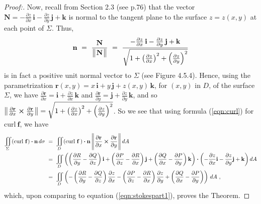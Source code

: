 \begin{proofbar}
\begin{proof}[Proof:]
 Now, recall from Section 2.3 (see p.76) that the vector $\mathbf{N} = -\frac{\partial z}{\partial x}\,\mathbf{i} -
 \frac{\partial z}{\partial y}\,\mathbf{j} + \mathbf{k}$ is normal to the tangent plane to the surface $z=z(x,y)$ at
 each point of $\Sigma$. Thus,
 \begin{displaymath}
  \mathbf{n} ~=~ \frac{\mathbf{N}}{\bigl\lVert\mspace{1mu}\mathbf{N}\mspace{1mu}\bigr\rVert} ~=~
   \frac{-\frac{\partial z}{\partial x}\,\mathbf{i} - \frac{\partial z}{\partial y}\,\mathbf{j} +
   \mathbf{k}}{\sqrt{1 + \left( \tfrac{\partial z}{\partial x} \right)^2 +
   \left( \tfrac{\partial z}{\partial y} \right)^2}}
 \end{displaymath}
 is in fact a positive unit normal vector to $\Sigma$ (see Figure 4.5.4). Hence, using the parametrization
 $\mathbf{r}(x,y) = x\,\mathbf{i} + y\,\mathbf{j} + z(x,y)\,\mathbf{k}$, for $(x,y)$ in $D$, of the surface $\Sigma$,
 we have $\frac{\partial \mathbf{r}}{\partial x} = \mathbf{i} + \frac{\partial z}{\partial x}\,\mathbf{k}$ and
 $\frac{\partial \mathbf{r}}{\partial y} = \mathbf{j} + \frac{\partial z}{\partial y}\,\mathbf{k}$, and so
 $\bigl\lVert\mspace{1mu}\frac{\partial \mathbf{r}}{\partial x} \bm{\times} \frac{\partial \mathbf{r}}{\partial y}\mspace{1mu}\bigr\rVert =
   \sqrt{1 + \left( \tfrac{\partial z}{\partial x} \right)^2 + \left( \tfrac{\partial z}{\partial y} \right)^2}$.
 So we see that using formula (\ref{eqn:curl}) for $\text{curl}~{\mathbf{f}}$, we have
 \begin{align*}
  \iint\limits_{\Sigma} (\text{curl}~{\mathbf{f}}) \bm{\cdot} \mathbf{n}\,d\sigma ~&=~
   \iint\limits_{D} (\text{curl}~{\mathbf{f}}\,) \bm{\cdot} \mathbf{n}\,
   \Biggl\lVert\mspace{1mu}\frac{\partial \mathbf{r}}{\partial x} \bm{\times} \frac{\partial \mathbf{r}}{\partial y}\mspace{1mu}\Biggr\rVert\,dA\\
   &=~ \iint\limits_{D} \left( \left( \frac{\partial R}{\partial y} - \frac{\partial Q}{\partial z} \right)
    \mathbf{i} + \left( \frac{\partial P}{\partial z} - \frac{\partial R}{\partial x} \right) \mathbf{j} +
    \left( \frac{\partial Q}{\partial x} - \frac{\partial P}{\partial y} \right) \mathbf{k}
    \right) \bm{\cdot} \left( -\frac{\partial z}{\partial x}\mathbf{i} - \frac{\partial z}{\partial y}\mathbf{j} +
    \mathbf{k} \right) dA\\
   &=~ \iint\limits_{D} \left(
    -\left( \frac{\partial R}{\partial y} - \frac{\partial Q}{\partial z} \right) \frac{\partial z}{\partial x}
    -\left( \frac{\partial P}{\partial z} - \frac{\partial R}{\partial x} \right) \frac{\partial z}{\partial y}
    + \left( \frac{\partial Q}{\partial x} - \frac{\partial P}{\partial y} \right) \right)\,dA ~,
 \end{align*}
 which, upon comparing to equation (\ref{eqn:stokespart1}), proves the Theorem.
 
\end{proof}\end{proofbar}

